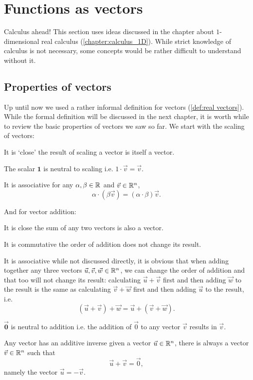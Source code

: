 \section{Functions as vectors}
\begin{note}{Calculus ahead!}{}
	This section uses ideas discussed in the chapter about $1$-dimensional real calculus (\autoref{chapter:calculus_1D}). While strict knowledge of calculus is not necessary, some concepts would be rather difficult to understand without it.
\end{note}

\subsection{Properties of vectors}
Up until now we used a rather informal definition for vectors (\autoref{def:real vectors}). While the formal definition will be discussed in the next chapter, it is worth while to review the basic properties of vectors we saw so far. We start with the scaling of vectors:
\begin{descitemize}
	\item[It is `close'] the result of scaling a vector is itself a vector.
	\item[The scalar $\bm{1}$ is neutral to scaling] i.e. $1\cdot\vec{v}=\vec{v}$.
	\item[It is associative] for any $\alpha,\beta\in\Rs$ and $\vec{v}\in\Rs[n]$,
		\[
			\alpha\cdot \left( \beta\vec{v} \right) = \left( \alpha\cdot\beta \right)\vec{v}.
		\]
\end{descitemize}

And for vector addition:
\begin{descitemize}
	\item[It is close] the sum of any two vectors is also a vector.
	\item[It is commutative] the order of addition does not change its result.
	\item[It is associative] while not discussed directly, it is obvious that when adding together any three vectors $\vec{u},\vec{v},\vec{w}\in \Rs[n]$, we can change the order of addition and that too will not change its result: calculating $\vec{u}+\vec{v}$ first and then adding $\vec{w}$ to the result is the same as calculating $\vec{v}+\vec{w}$ first and then adding $\vec{u}$ to the result, i.e.
		\[
			\left( \vec{u}+\vec{v} \right) + \vec{w} = \vec{u} + \left( \vec{v}+\vec{w} \right).
		\]
	\item[$\bm{\vec{0}}$ is neutral to addition] i.e. the addition of $\vec{0}$ to any vector $\vec{v}$ results in $\vec{v}$.
	\item[Any vector has an additive inverse] given a vector $\vec{u}\in\Rs[n]$, there is always a vector $\vec{v}\in\Rs[n]$ such that
		\[
			\vec{u}+\vec{v}=\vec{0},
		\]
		namely the vector $\vec{u}=-\vec{v}$.
\end{descitemize}

